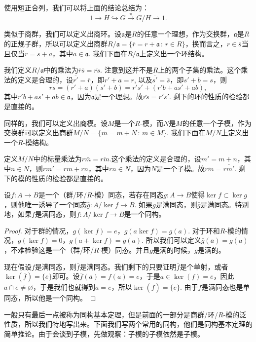 使用短正合列，我们可以将上面的结论总结为：
\[
	1\to H \hookrightarrow G \xrightarrow{\pi} G/H\to 1.
\]

\para[商环] 类似于商群，我们可以定义出商环。设$\mathfrak{a}$是$R$的任意一个理想，作为交换群，$\mathfrak{a}$是$R$的正规子群，所以可以定义出商群$R/\mathfrak{a}=\{\bar{r}=r+\mathfrak{a}\,:\, r\in R\}$，换而言之，$r\in \bar{s}$当且仅当$r=s+a$，其中$a\in \mathfrak{a}$. 我们下面在$R/\mathfrak{a}$上定义出一个环结构。

我们定义$R/\mathfrak{a}$中的乘法为$\bar{r}\bar{s}=\overline{rs}$. 注意到这并不是$R$上的两个子集的乘法。这个乘法的定义是合理的，设$\overline{r'}=\bar{r}$，即$r'+a=r$, 以及$\overline{s'}=\bar{s}$，即$s'+b =s$，则
\[
	rs=(r'+a)(s'+b)=r's'+(r'b+as'+ab),
\]
其中$r'b+as'+ab\in \mathfrak{a}$，因为$\mathfrak{a}$是一个理想。故$\overline{rs}=\overline{r's'}$. 剩下的环的性质的检验都是直接的。

\para[商模] 同样的，我们可以定义出商模。设$M$是一个$R$-模，而$N$是$M$的任意一个子模，作为交换群可以定义出商群$M/N=\{\bar{m}=m+N\,:\, m\in M\}$. 我们下面在$M/N$上定义出一个$R$-模结构。

定义$M/N$中的标量乘法为$r\bar{m}=\overline{rm}$.这个乘法的定义是合理的，设$m'=m+n$，其中$n\in N$，则$rm'=rm+rn$，其中$rn\in N$，因为$N$是一个子模。故$\overline{rm}=\overline{rm'}$. 剩下的模的性质的检验都是直接的。

\begin{thm}[同构基本定理]
设$f:A\to B$是一个（群/环/$R$-模）同态，若存在同态$g: A\to B$使得$\ker f\subset \ker g$，则他唯一诱导了一个同态$\bar{g}:A/\ker{f}\to B$. 如果$g$是满同态，则$\bar{g}$是满同态。特别地，如果$f$是满同态，则$\bar{f}: A/\ker{f}\to B$是一个同构。
\end{thm}

\begin{proof}
	对于群的情况，$g(\ker f)=e$，$g(a\ker f)=g(a)$. 对于环和$R$-模的情况，$g(\ker f)=0$，$g(a+\ker f)=g(a)$. 所以我们可以定义$\bar{g}(\bar{a})=g(a)$，不难检验这是一个（群/环/$R$-模）同态。并且$g$是满的时候，$\bar{g}$是满的。

	现在假设$f$是满同态，则$\bar{f}$是满同态。我们剩下的只要证明$\bar{f}$是个单射，或者$\ker(\bar{f})=\{\bar{e}\}$即可。设$\bar{f}(\bar{a})=f(a)=e$，于是$a\in \ker(f)=\bar{e}$，因此$\bar{a}\cap \bar{e}\neq\varnothing$，于是我们也就得到$\bar{a}=\bar{e}$，所以$\ker(\bar{f})=\{\bar{e}\}$. 由于$\bar{f}$是满同态也是单同态，所以他是一个同构。
\end{proof}

一般只有最后一点被称为同构基本定理，但是前面的一部分是商群/环/$R$-模的泛性质，所以我们特地写出来。下面我们写两个常用的同构，他们是同构基本定理的简单推论。由于会谈到子模，先做观察：子模的子模依然是子模。

